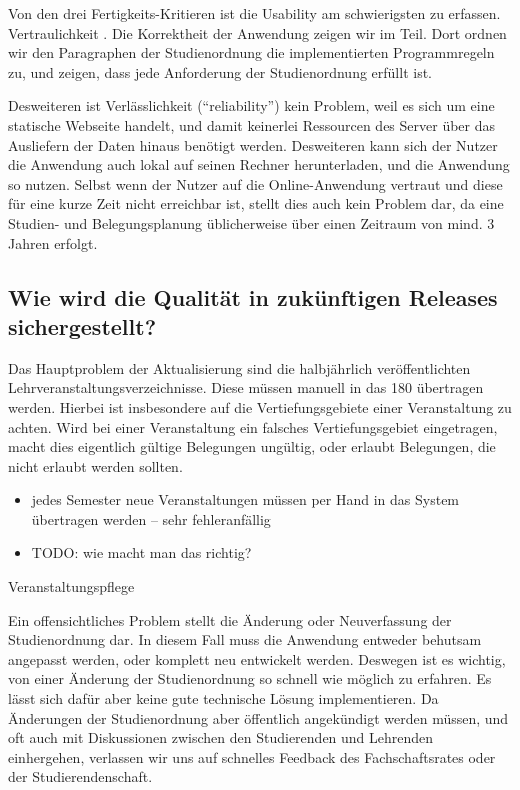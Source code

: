 \documentclass[ngerman]{article}
\begin{document}
Von den drei Fertigkeits-Kritieren ist die Usability am schwierigsten zu erfassen.
Vertraulichkeit .
Die Korrektheit der Anwendung zeigen wir im  Teil.
Dort ordnen wir den Paragraphen der Studienordnung die implementierten Programmregeln zu, und zeigen, dass jede Anforderung der Studienordnung erfüllt ist.

Desweiteren ist Verlässlichkeit (``reliability'') kein Problem, weil es sich um eine statische Webseite handelt, und damit keinerlei Ressourcen des Server über das Ausliefern der Daten hinaus benötigt werden.
Desweiteren kann sich der Nutzer die Anwendung auch lokal auf seinen Rechner herunterladen, und die Anwendung so nutzen.
Selbst wenn der Nutzer auf die Online-Anwendung vertraut und diese für eine kurze Zeit nicht erreichbar ist, stellt dies auch kein Problem dar, da eine Studien- und Belegungsplanung üblicherweise über einen Zeitraum von mind. 3 Jahren erfolgt.

\subsection{Wie wird die Qualität in zukünftigen Releases sichergestellt?}

Das Hauptproblem der Aktualisierung sind die halbjährlich veröffentlichten Lehrveranstaltungsverzeichnisse.
Diese müssen manuell in das 180 übertragen werden.
Hierbei ist insbesondere auf die Vertiefungsgebiete einer Veranstaltung zu achten.
Wird bei einer Veranstaltung ein falsches Vertiefungsgebiet eingetragen, macht dies eigentlich gültige Belegungen ungültig, oder erlaubt Belegungen, die nicht erlaubt werden sollten.

\begin{itemize}
    \item
        jedes Semester neue Veranstaltungen müssen per Hand in das System übertragen werden -- sehr fehleranfällig
    \item
        TODO: wie macht man das richtig?
\end{itemize}

Veranstaltungspflege

Ein offensichtliches Problem stellt die Änderung oder Neuverfassung der Studienordnung dar.
In diesem Fall muss die Anwendung entweder behutsam angepasst werden, oder komplett neu entwickelt werden.
Deswegen ist es wichtig, von einer Änderung der Studienordnung so schnell wie möglich zu erfahren.
Es lässt sich dafür aber keine gute technische Lösung implementieren.
Da Änderungen der Studienordnung aber öffentlich angekündigt werden müssen, und oft auch mit Diskussionen zwischen den Studierenden und Lehrenden einhergehen, verlassen wir uns auf schnelles Feedback des Fachschaftsrates oder der Studierendenschaft.
\end{document}
